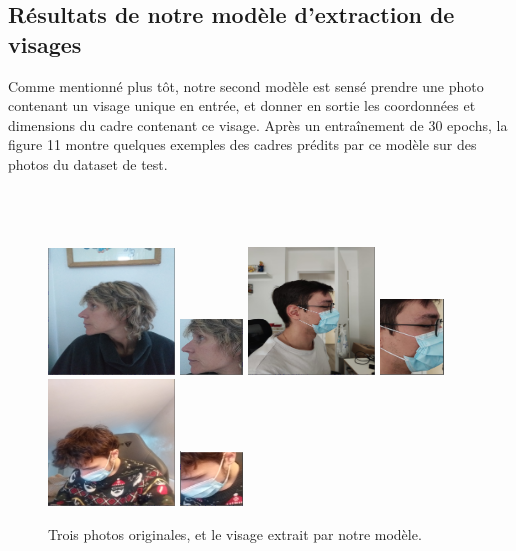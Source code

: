 \documentclass{article}
\begin{document}
\subsection{Résultats de notre modèle d'extraction de visages}
Comme mentionné plus tôt, notre second modèle est sensé prendre une photo contenant un visage unique en entrée, et donner en sortie les coordonnées et dimensions du cadre contenant ce visage. Après un entraînement de 30 epochs, la figure 11 montre quelques exemples des cadres prédits par ce modèle sur des photos du dataset de test.\\\\\\\\
\begin{figure}[h]
\centering
\includegraphics[width=0.3\textwidth]{original_resized5.png}
\includegraphics[width=0.15\textwidth]{extracted5.png}
\includegraphics[width=0.3\textwidth]{original_resized4.png}
\includegraphics[width=0.15\textwidth]{extracted4.png}
\includegraphics[width=0.3\textwidth]{original_resized3.png}
\includegraphics[width=0.15\textwidth]{extracted3.png}
\caption{\label{fig:Input}Trois photos originales, et le visage extrait par notre modèle.\\}
\end{figure}
\end{document}
